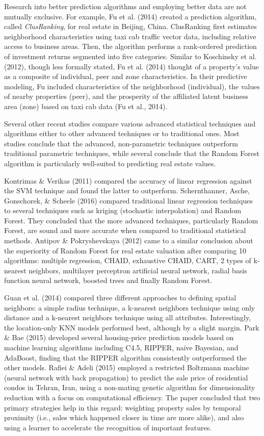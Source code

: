 \documentclass[12pt,]{article}
\begin{document}
Research into better prediction algorithms and employing better data are
not mutually exclusive. For example, Fu et al. (2014) created a
prediction algorithm, called \emph{ClusRanking}, for real estate in
Beijing, China. ClusRanking first estimates neighborhood characteristics
using taxi cab traffic vector data, including relative access to
business areas. Then, the algorithm performs a rank-ordered prediction
of investment returns segmented into five categories. Similar to
Koschinsky et al. (2012), though less formally stated, Fu et al. (2014)
thought of a property's value as a composite of individual, peer and
zone characteristics. In their predictive modeling, Fu included
characteristics of the neighborhood (individual), the values of nearby
properties (peer), and the prosperity of the affiliated latent business
area (zone) based on taxi cab data (Fu et al., 2014).

Several other recent studies compare various advanced statistical
techniques and algorithms either to other advanced techniques or to
traditional ones. Most studies conclude that the advanced,
non-parametric techniques outperform traditional parametric techniques,
while several conclude that the Random Forest algorithm is particularly
well-suited to predicting real estate values.

Kontrimas \& Verikas (2011) compared the accuracy of linear regression
against the SVM technique and found the latter to outperform.
Schernthanner, Asche, Gonschorek, \& Scheele (2016) compared traditional
linear regression techniques to several techniques such as kriging
(stochastic interpolation) and Random Forest. They concluded that the
more advanced techniques, particularly Random Forest, are sound and more
accurate when compared to traditional statistical methods. Antipov \&
Pokryshevskaya (2012) came to a similar conclusion about the superiority
of Random Forest for real estate valuation after comparing 10
algorithms: multiple regression, CHAID, exhaustive CHAID, CART, 2 types
of k-nearest neighbors, multilayer perceptron artificial neural network,
radial basis function neural network, boosted trees and finally Random
Forest.

Guan et al. (2014) compared three different approaches to defining
spatial neighbors: a simple radius technique, a k-nearest neighbors
technique using only distance and a k-nearest neighbors technique using
all attributes. Interestingly, the location-only KNN models performed
best, although by a slight margin. Park \& Bae (2015) developed several
housing-price prediction models based on machine learning algorithms
including C4.5, RIPPER, naive Bayesian, and AdaBoost, finding that the
RIPPER algorithm consistently outperformed the other models. Rafiei \&
Adeli (2015) employed a restricted Boltzmann machine (neural network
with back propagation) to predict the sale price of residential condos
in Tehran, Iran, using a non-mating genetic algorithm for dimensionality
reduction with a focus on computational efficiency. The paper concluded
that two primary strategies help in this regard: weighting property
sales by temporal proximity (i.e., sales which happened closer in time
are more alike), and also using a learner to accelerate the recognition
of important features.
\end{document}
